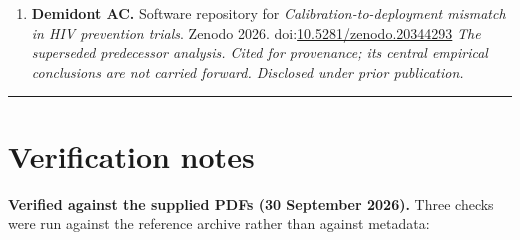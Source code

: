 \begin{enumerate}
  \textbf{ClinicalTrials.gov.} PURPOSE 4: NCT06101342. Study of lenacapavir and emtricitabine/tenofovir disoproxil fumarate for pre-exposure prophylaxis in people who inject drugs. \emph{§3.10 and §4.7. Phase 2, open-label, multicentre, randomised; pharmacokinetics and safety; eligibility 18 years and older with no upper bound; nine US locations; 181 participants enrolled; start December 2023, actual primary completion July 2026. Registry record consulted 29 September 2026. No efficacy estimate is corrected or commented on; the trial reports none.}
\item
  \textbf{Demidont AC.} Software repository for \emph{Calibration-to-deployment mismatch in HIV prevention trials}. Zenodo 2026. doi:\href{https://doi.org/10.5281/zenodo.20344293}{10.5281/zenodo.20344293}
  \emph{The superseded predecessor analysis. Cited for provenance; its central empirical conclusions are not carried forward. Disclosed under prior publication.}
\end{enumerate}

\begin{center}\rule{0.5\linewidth}{0.5pt}\end{center}

\section{Verification notes}

\textbf{Verified against the supplied PDFs (30 September 2026).} Three checks were run against the
reference archive rather than against metadata:

